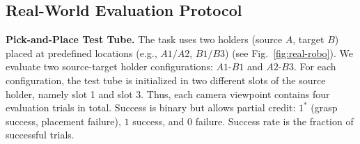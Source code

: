 \subsection{Real-World Evaluation Protocol} \label{app:real_world_protocol}

\textbf{Pick-and-Place Test Tube.} 
The task uses two holders (source $A$, target $B$) placed at predefined locations (e.g., $A1/A2$, $B1/B3$) (see Fig.~\ref{fig:real-robo}). We evaluate two source-target holder configurations: \(A1\)-\(B1\) and \(A2\)-\(B3\). For each configuration, the test tube is initialized in two different slots of the source holder, namely slot 1 and slot 3. Thus, each camera viewpoint contains four evaluation trials in total. Success is binary but allows partial credit: $1^*$ (grasp success, placement failure), $1$ success, and $0$ failure. Success rate is the fraction of successful trials.

